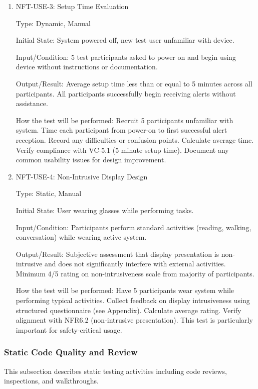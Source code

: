 \documentclass[12pt, titlepage]{article}
\begin{document}
\begin{enumerate}
\item{NFT-USE-3: Setup Time Evaluation\\}

Type: Dynamic, Manual

Initial State: System powered off, new test user unfamiliar with device.

Input/Condition: 5 test participants asked to power on and begin using device
without instructions or documentation.

Output/Result: Average setup time less than or equal to 5 minutes across all participants. All
participants successfully begin receiving alerts without assistance.

How the test will be performed: Recruit 5 participants unfamiliar with system. Time
each participant from power-on to first successful alert reception. Record any
difficulties or confusion points. Calculate average time. Verify compliance with
VC-5.1 (5 minute setup time). Document any common usability issues for design
improvement.

\item{NFT-USE-4: Non-Intrusive Display Design\\}

Type: Static, Manual

Initial State: User wearing glasses while performing tasks.

Input/Condition: Participants perform standard activities (reading, walking,
conversation) while wearing active system.

Output/Result: Subjective assessment that display presentation is non-intrusive
and does not significantly interfere with external activities. Minimum 4/5
rating on non-intrusiveness scale from majority of participants.

How the test will be performed: Have 5 participants wear system while performing
typical activities. Collect feedback on display intrusiveness using structured
questionnaire (see Appendix). Calculate average rating. Verify alignment with
NFR6.2 (non-intrusive presentation). This test is particularly important for
safety-critical usage.

\end{enumerate}

\subsubsection{Static Code Quality and Review}

This subsection describes static testing activities including code reviews,
inspections, and walkthroughs.
\end{document}
